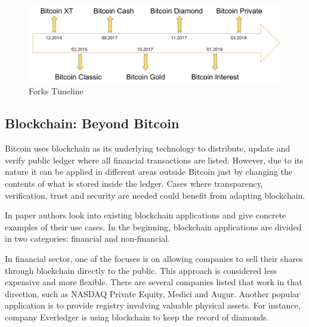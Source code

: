 \documentclass[conference,compsoc]{IEEEtran}
\begin{document}
\begin{figure}[h]
  \centering
  \includegraphics[width=.45\textwidth]{graphics/timeline.png}
  \caption{Forks Timeline}
  \label{fig:fig10}
\end{figure}


\subsection{Blockchain: Beyond Bitcoin}
Bitcoin uses blockchain as its underlying technology to distribute, update and verify public ledger where all financial transactions are listed. 
However, due to its nature it can be applied in different areas outside Bitcoin just by changing the contents of what is stored inside the ledger. 
Cases where transparency, verification, trust and security are needed could benefit from adapting blockchain.

In paper \cite{beyond} authors look into existing blockchain applications and give concrete examples of their use cases.
In the beginning, blockchain applications are divided in two categories: financial and non-financial.

In financial sector, one of the focuses is on allowing companies to sell their shares through blockchain directly to the public. 
This approach is considered less expensive and more flexible. 
There are several companies listed that work in that direction, such as NASDAQ Private Equity, Medici and Augur.
Another popular application is to provide registry involving valuable physical assets. 
For instance, company Everledger is using blockchain to keep the record of diamonds.
\end{document}
